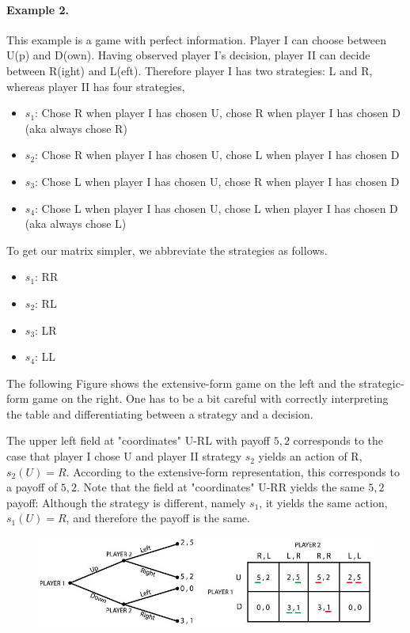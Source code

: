 \paragraph{Example 2.} This example is a game with perfect information. Player I can choose between U(p) and D(own). Having observed player I's decision, player II can decide between R(ight) and L(eft). Therefore player I has two strategies: L and R, whereas player II has four strategies,

\begin{itemize}
	\item $s_1$: Chose R when player I has chosen U, chose R when player I has chosen D (aka always chose R)
	\item $s_2$: Chose R when player I has chosen U, chose L when player I has chosen D
	\item $s_3$: Chose L when player I has chosen U, chose R when player I has chosen D
	\item $s_4$: Chose L when player I has chosen U, chose L when player I has chosen D (aka always chose L)
\end{itemize}

To get our matrix simpler, we abbreviate the strategies as follows.

\begin{itemize}
	\item $s_1$: RR
	\item $s_2$: RL
	\item $s_3$: LR
	\item $s_4$: LL
\end{itemize}

The following Figure shows the extensive-form game on the left and the strategic-form game on the right. One has to be a bit careful with correctly interpreting the table and differentiating between a strategy and a decision.

The upper left field at "coordinates" U-RL with payoff $5,2$ corresponds to the case that player I chose U and player II strategy $s_2$ yields an action of R, $s_2(U) = R$. According to the extensive-form representation, this corresponds to a payoff of $5,2$. Note that the field at "coordinates" U-RR yields the same $5,2$ payoff: Although the strategy is different, namely $s_1$, it yields the same action, $s_1(U) = R$, and therefore the payoff is the same.

\begin{figure}[H]
    \centering
    \includegraphics[scale=0.7]{images/2023-10-10-game_theory_07.png}
\end{figure}

